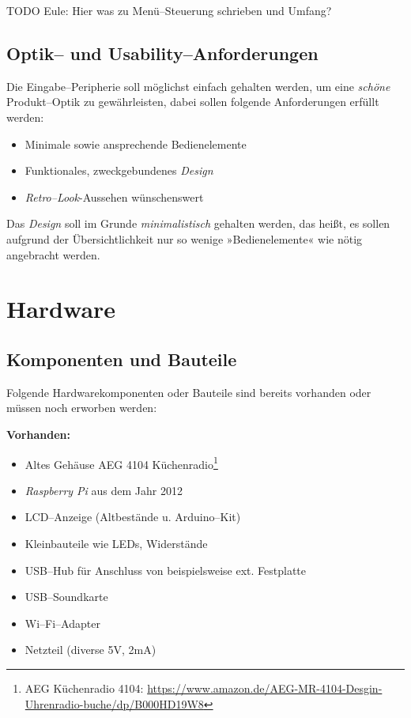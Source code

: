 \documentclass[11pt,ngerman,toc=listof,index=totoc]{scrreprt}
\providecommand{\tightlist}{%
  \setlength{\itemsep}{0pt}\setlength{\parskip}{0pt}}
\begin{document}
TODO Eule: Hier was zu Menü--Steuerung schrieben und Umfang?

\section{Optik-- und
Usability--Anforderungen}\label{optik-und-usabilityanforderungen}

Die Eingabe--Peripherie soll möglichst einfach gehalten werden, um eine
\emph{schöne} Produkt--Optik zu gewährleisten, dabei sollen folgende
Anforderungen erfüllt werden:

\begin{itemize}
\tightlist
\item
  Minimale sowie ansprechende Bedienelemente
\item
  Funktionales, zweckgebundenes \emph{Design}
\item
  \emph{Retro--Look}-Aussehen wünschenswert
\end{itemize}

Das \emph{Design} soll im Grunde \emph{minimalistisch} gehalten werden,
das heißt, es sollen aufgrund der Übersichtlichkeit nur so wenige
»Bedienelemente« wie nötig angebracht werden.

\chapter{Hardware}\label{hardware}

\section{Komponenten und Bauteile}\label{komponenten-und-bauteile}

Folgende Hardwarekomponenten oder Bauteile sind bereits vorhanden oder
müssen noch erworben werden:

\textbf{Vorhanden:}

\begin{itemize}
\tightlist
\item
  Altes Gehäuse AEG 4104 Küchenradio\footnote{AEG Küchenradio 4104:
    \url{https://www.amazon.de/AEG-MR-4104-Desgin-Uhrenradio-buche/dp/B000HD19W8}}
\item
  \emph{Raspberry Pi} aus dem Jahr 2012
\item
  LCD--Anzeige (Altbestände u. Arduino--Kit)
\item
  Kleinbauteile wie LEDs, Widerstände
\item
  USB--Hub für Anschluss von beispielsweise ext. Festplatte
\item
  USB--Soundkarte
\item
  Wi--Fi--Adapter
\item
  Netzteil (diverse 5V, 2mA)
\end{itemize}
\end{document}
